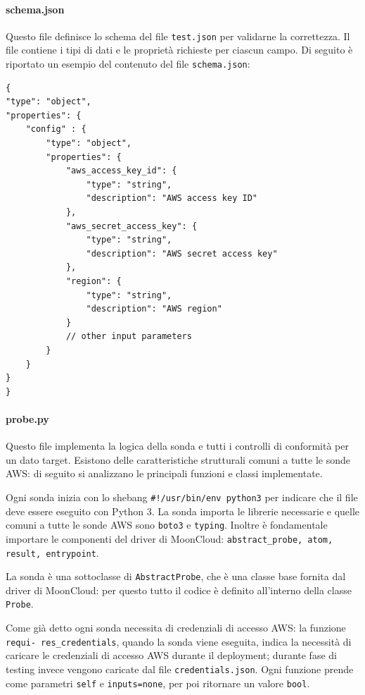 \paragraph{schema.json} Questo file definisce lo schema del file \texttt{test.json} per validarne la correttezza. Il file contiene i tipi di dati e le proprietà richieste per ciascun campo. Di seguito è riportato un esempio del contenuto del file \texttt{schema.json}:

\begin{lstlisting}[style=myjson]
{
"type": "object",
"properties": {
    "config" : {
        "type": "object",
        "properties": {
            "aws_access_key_id": {
                "type": "string",
                "description": "AWS access key ID"
            },
            "aws_secret_access_key": {
                "type": "string",
                "description": "AWS secret access key"
            },
            "region": {
                "type": "string",
                "description": "AWS region"
            }
            // other input parameters 
        }
    }
}   
}
\end{lstlisting}

\paragraph{probe.py} Questo file implementa la logica della sonda e tutti i controlli di conformità per un dato target. Esistono delle caratteristiche strutturali comuni a tutte le sonde AWS: di seguito si analizzano le principali funzioni e classi implementate.

Ogni sonda inizia con lo shebang \texttt{\#!/usr/bin/env python3} per indicare che il file deve essere eseguito con Python 3. La sonda importa le librerie necessarie e quelle comuni a tutte le sonde AWS sono \texttt{boto3} e \texttt{typing}. Inoltre è fondamentale importare le componenti del driver di MoonCloud: \texttt{abstract\_probe, atom, result, entrypoint}.

La sonda è una sottoclasse di \texttt{AbstractProbe}, che è una classe base fornita dal driver di MoonCloud: per questo tutto il codice è definito all'interno della classe \texttt{Probe}. 

Come già detto ogni sonda necessita di credenziali di accesso AWS: la funzione \texttt{requi-
res\_credentials}, quando la sonda viene eseguita, indica la necessità di caricare le credenziali di accesso AWS durante il deployment; durante fase di testing invece vengono caricate dal file \texttt{credentials.json}. Ogni funzione prende come parametri \texttt{self} e \texttt{inputs=none}, per poi ritornare un valore \texttt{bool}. 

